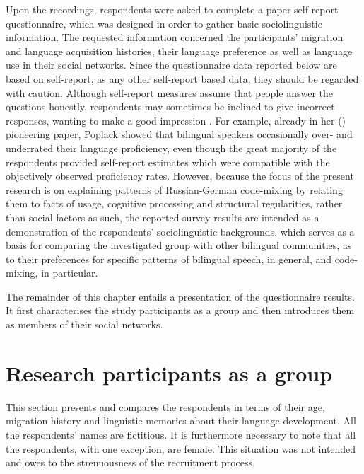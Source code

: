 Upon the recordings, respondents were asked to complete a paper self-report questionnaire, which was designed in order to gather basic sociolinguistic information. The requested information concerned the participants' migration and language acquisition histories, their language preference as well as language use in their social networks. Since the questionnaire data reported below are based on self-report, as any other self-report based data, they should be regarded with caution. Although self-report measures assume that people answer the questions honestly, respondents may sometimes be inclined to give incorrect responses, wanting to make a good impression \citep[cf.][208]{social-psychology}. For example, already in her (\citeyear{poplack-sometimes-1980}) pioneering paper, Poplack showed that bilingual speakers occasionally over- and underrated their language proficiency, even though the great majority of the respondents provided self-report estimates which were compatible with the objectively observed proficiency rates. However, because the focus of the present research is on explaining patterns of Russian-German code-mixing by relating them to facts of usage, cognitive processing and structural regularities, rather than social factors as such, the reported survey results are intended as a demonstration of the respondents' sociolinguistic backgrounds, which serves as a basis for comparing the investigated group with other bilingual communities, as to their preferences for specific patterns of bilingual speech, in general, and code-mixing, in particular.

The remainder of this chapter entails a presentation of the questionnaire results. It first characterises the study participants as a group and then introduces them as members of their social networks.

\section{Research participants as a group}
This section presents and compares the respondents in terms of their age, migration history and linguistic memories about their language development. All the respondents' names are fictitious. It is furthermore necessary to note that all the respondents, with one exception, are female. This situation was not intended and owes to the strenuousness of the recruitment process.


